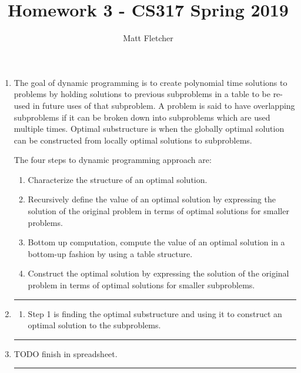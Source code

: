 \documentclass{article}
\title{Homework 3 - CS317 Spring 2019}
\author{Matt Fletcher}
\begin{document}
\maketitle

\begin{enumerate}

\item The goal of dynamic programming is to create polynomial time solutions to problems by holding solutions to previous subproblems in a table to be re-used in future uses of that subproblem. A problem is said to have overlapping subproblems if it can be broken down into subproblems which are used multiple times. Optimal substructure is when the globally optimal solution can be constructed from locally optimal solutions to subproblems.
    
    The four steps to dynamic programming approach are:

\begin{enumerate}
	\item Characterize the structure of an optimal solution. 
	
	\item Recursively define the value of an optimal solution by expressing the solution of the original problem in terms of optimal solutions for smaller problems. 

	\item Bottom up computation, compute the value of an optimal solution in a bottom-up fashion by using a table structure. 

	\item Construct the optimal solution by expressing the solution of the original problem in terms of optimal solutions for smaller subproblems. 
	 
\end{enumerate}

\noindent\rule{8cm}{0.4pt}

\item  
    \begin{enumerate}
        \item Step 1 is finding the optimal substructure and using it to construct an optimal solution to the subproblems. 
    \end{enumerate}
\noindent\rule{8cm}{0.4pt}

\item TODO finish in spreadsheet.

\noindent\rule{8cm}{0.4pt}


\end{enumerate}
\end{document}

